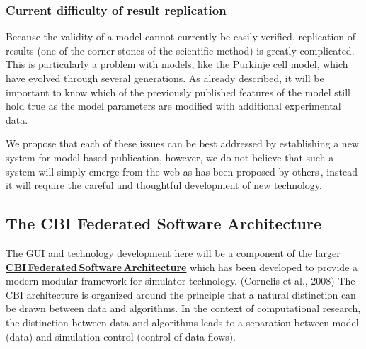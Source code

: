 \documentclass[12pt]{article}
\begin{document}
\subsubsection*{Current difficulty of result replication}

Because the validity of a model cannot currently be easily verified, replication of results (one of the corner stones of the scientific method) is greatly complicated.  This is particularly a problem with models, like the Purkinje cell model, which have evolved through several generations.  As already described, it will be important to know which of the previously published features of the model still hold true as the model parameters are modified with additional experimental data.

We propose that each of these issues can be best addressed by establishing a new system for model-based publication, however, we do not believe that such a system will simply emerge from the web as has been proposed by others\,\cite{Nickerson:2009uq}, instead it will require the careful and thoughtful development of new technology.

\subsection*{The CBI Federated Software Architecture}

The GUI and technology development here will be a component of the larger \href{../genesis-overview/genesis-overview.tex}{\bf CBI\,Federated\,Software\,Architecture} which has been developed to provide a modern modular framework for simulator technology. (Cornelis et al., 2008)  The CBI architecture is organized around the principle that a natural distinction can be drawn between data and algorithms.  In the context of computational research, the distinction between data and algorithms leads to a separation between model (data) and simulation control (control of data flows).
\end{document}
